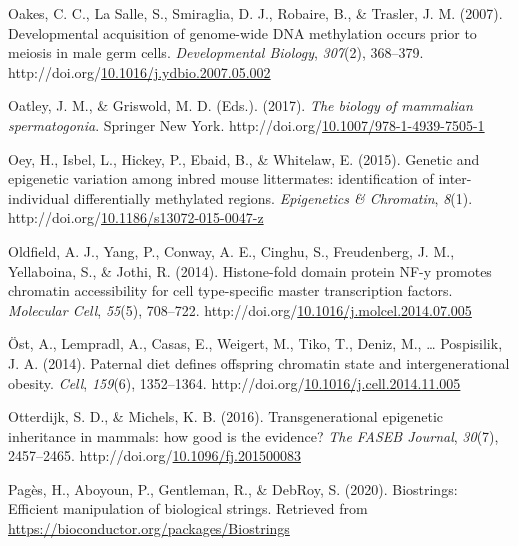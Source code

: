 \documentclass[12pt,twoside]{reedthesis}
\newlength{\cslhangindent}
\newenvironment{CSLReferences}[2] %
 {%
  \setlength{\parindent}{0pt}
  \ifodd #1 \everypar{\setlength{\hangindent}{\cslhangindent}}\ignorespaces\fi
  \ifnum #2 > 0
  \setlength{\parskip}{#2\baselineskip}
  \fi
 }%
 {}
\begin{document}
\begin{CSLReferences}{1}{0}
\leavevmode{}%
Oakes, C. C., La Salle, S., Smiraglia, D. J., Robaire, B., \& Trasler, J. M. (2007). Developmental acquisition of genome-wide DNA methylation occurs prior to meiosis in male germ cells. \emph{Developmental Biology}, \emph{307}(2), 368--379. http://doi.org/\href{https://doi.org/10.1016/j.ydbio.2007.05.002}{10.1016/j.ydbio.2007.05.002}

\leavevmode{}%
Oatley, J. M., \& Griswold, M. D. (Eds.). (2017). \emph{The biology of mammalian spermatogonia}. Springer New York. http://doi.org/\href{https://doi.org/10.1007/978-1-4939-7505-1}{10.1007/978-1-4939-7505-1}

\leavevmode{}%
Oey, H., Isbel, L., Hickey, P., Ebaid, B., \& Whitelaw, E. (2015). Genetic and epigenetic variation among inbred mouse littermates: identification of inter-individual differentially methylated regions. \emph{Epigenetics \& Chromatin}, \emph{8}(1). http://doi.org/\href{https://doi.org/10.1186/s13072-015-0047-z}{10.1186/s13072-015-0047-z}

\leavevmode{}%
Oldfield, A. J., Yang, P., Conway, A. E., Cinghu, S., Freudenberg, J. M., Yellaboina, S., \& Jothi, R. (2014). Histone-fold domain protein NF-y promotes chromatin accessibility for cell type-specific master transcription factors. \emph{Molecular Cell}, \emph{55}(5), 708--722. http://doi.org/\href{https://doi.org/10.1016/j.molcel.2014.07.005}{10.1016/j.molcel.2014.07.005}

\leavevmode{}%
Öst, A., Lempradl, A., Casas, E., Weigert, M., Tiko, T., Deniz, M., \ldots{} Pospisilik, J. A. (2014). Paternal diet defines offspring chromatin state and intergenerational obesity. \emph{Cell}, \emph{159}(6), 1352--1364. http://doi.org/\href{https://doi.org/10.1016/j.cell.2014.11.005}{10.1016/j.cell.2014.11.005}

\leavevmode{}%
Otterdijk, S. D., \& Michels, K. B. (2016). Transgenerational epigenetic inheritance in mammals: how good is the evidence? \emph{The FASEB Journal}, \emph{30}(7), 2457--2465. http://doi.org/\href{https://doi.org/10.1096/fj.201500083}{10.1096/fj.201500083}

\leavevmode{}%
Pagès, H., Aboyoun, P., Gentleman, R., \& DebRoy, S. (2020). Biostrings: Efficient manipulation of biological strings. Retrieved from \url{https://bioconductor.org/packages/Biostrings}


\end{CSLReferences}
\end{document}
